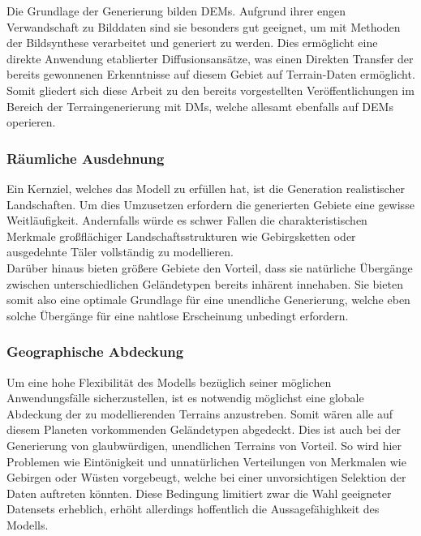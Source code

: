 Die Grundlage der Generierung bilden DEMs. Aufgrund ihrer engen Verwandschaft zu Bilddaten sind sie besonders gut geeignet, um mit Methoden der Bildsynthese verarbeitet und generiert zu werden. Dies ermöglicht eine direkte Anwendung etablierter Diffusionsansätze, was einen Direkten Transfer der bereits gewonnenen Erkenntnisse auf diesem Gebiet auf Terrain-Daten ermöglicht. Somit  gliedert sich diese Arbeit zu den bereits vorgestellten Veröffentlichungen im Bereich der Terraingenerierung mit DMs, welche allesamt ebenfalls auf DEMs operieren.

\subsubsection {Räumliche Ausdehnung}

Ein Kernziel, welches das Modell zu erfüllen hat, ist die Generation realistischer Landschaften. Um dies Umzusetzen erfordern die generierten Gebiete eine gewisse Weitläufigkeit. Andernfalls würde es schwer Fallen die charakteristischen Merkmale großflächiger Landschaftsstrukturen wie Gebirgsketten oder ausgedehnte Täler vollständig zu modellieren. \\
Darüber hinaus bieten größere Gebiete den Vorteil, dass sie natürliche Übergänge zwischen unterschiedlichen Geländetypen bereits inhärent innehaben. Sie bieten somit also eine optimale Grundlage für eine unendliche Generierung, welche eben solche Übergänge für eine nahtlose Erscheinung unbedingt erfordern.  

\subsubsection {Geographische Abdeckung}

Um eine hohe Flexibilität des Modells bezüglich seiner möglichen Anwendungsfälle sicherzustellen, ist es notwendig möglichst eine globale Abdeckung der zu modellierenden Terrains anzustreben. Somit wären alle auf diesem Planeten vorkommenden Geländetypen abgedeckt. Dies ist auch bei der Generierung von glaubwürdigen, unendlichen Terrains von Vorteil. So wird hier Problemen wie Eintönigkeit und unnatürlichen Verteilungen von Merkmalen wie Gebirgen oder Wüsten vorgebeugt, welche bei einer unvorsichtigen Selektion der Daten auftreten könnten. Diese Bedingung limitiert zwar die Wahl geeigneter Datensets erheblich, erhöht allerdings hoffentlich die Aussagefähighkeit des Modells.  

